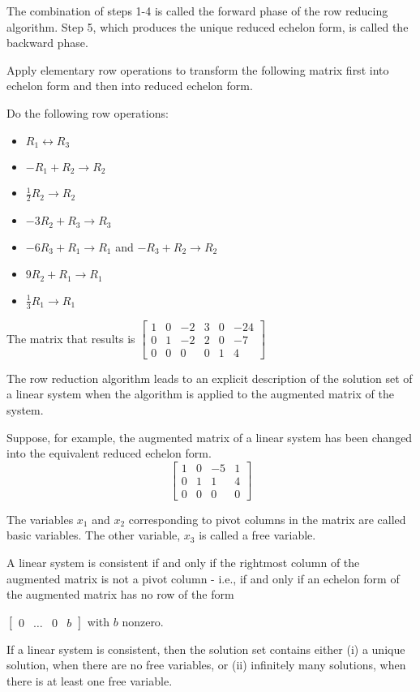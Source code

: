 \documentclass[../linalg.tex]{subfiles}
\begin{document}
The combination of steps 1-4 is called the forward phase of the row reducing algorithm. Step 5, which produces the unique reduced echelon form, is called the backward phase.

\begin{example}
    Apply elementary row operations to transform the following matrix first into echelon form and then into reduced echelon form.

    Do the following row operations:
    \begin{itemize}
        \item $R_1\leftrightarrow R_3$
        \item $-R_1+R_2\rightarrow R_2$
        \item $\frac{1}{2}R_2\rightarrow R_2$
        \item $-3R_2+R_3\rightarrow R_3$
        \item $-6R_3+R_1\rightarrow R_1$ and $-R_3+R_2\rightarrow R_2$
        \item $9R_2+R_1\rightarrow R_1$
        \item $\frac{1}{3}R_1\rightarrow R_1$
    \end{itemize}
    
    The matrix that results is $\begin{bmatrix}
        1&0&-2&3&0&-24\\
        0&1&-2&2&0&-7\\
        0&0&0&0&1&4
    \end{bmatrix}$
\end{example}

The row reduction algorithm leads to an explicit description of the solution set of a linear system when the algorithm is applied to the augmented matrix of the system.

Suppose, for example, the augmented matrix of a linear system has been changed into the equivalent reduced echelon form.
\[ \begin{bmatrix}
    1&0&-5&1\\
    0&1&1&4\\
    0&0&0&0
\end{bmatrix}\]

The variables $x_1$ and $x_2$ corresponding to pivot columns in the matrix are called basic variables. The other variable, $x_3$ is called a free variable.

\begin{theorem}
    A linear system is consistent if and only if the rightmost column of the augmented matrix is not a pivot column - i.e., if and only if an echelon form of the augmented matrix has no row of the form 
    \begin{center}
        $\begin{bmatrix}
            0&\dots & 0 & b
        \end{bmatrix}$ with $b$ nonzero.
    \end{center}
    If a linear system is consistent, then the solution set contains either (i) a unique solution, when there are no free variables, or (ii) infinitely many solutions, when there is at least one free variable.
\end{theorem}
\end{document}
